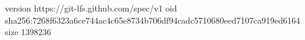 version https://git-lfs.github.com/spec/v1
oid sha256:7268f6323a6ce744ac4c65e8734b706df94cadc5710680eed7107ca919ed6164
size 1398236
